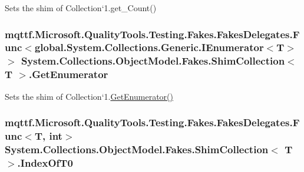 Sets the shim of Collection`1.get\-\_\-\-Count()

\hypertarget{class_system_1_1_collections_1_1_object_model_1_1_fakes_1_1_shim_collection_3_01_t_01_4_a61fd9b444d192f1d14a4c82d6c7f905e}{
\subsubsection[{Get\-Enumerator}]{\setlength{\rightskip}{0pt plus 5cm}mqttf.\-Microsoft.\-Quality\-Tools.\-Testing.\-Fakes.\-Fakes\-Delegates.\-Func$<$global.\-System.\-Collections.\-Generic.\-I\-Enumerator$<$T$>$ $>$ System.\-Collections.\-Object\-Model.\-Fakes.\-Shim\-Collection$<$ T $>$.Get\-Enumerator\hspace{0.3cm}{\ttfamily [set]}}}\label{class_system_1_1_collections_1_1_object_model_1_1_fakes_1_1_shim_collection_3_01_t_01_4_a61fd9b444d192f1d14a4c82d6c7f905e}


Sets the shim of Collection`1.\hyperlink{class_system_1_1_collections_1_1_object_model_1_1_fakes_1_1_shim_collection_3_01_t_01_4_a61fd9b444d192f1d14a4c82d6c7f905e}{Get\-Enumerator()}

\hypertarget{class_system_1_1_collections_1_1_object_model_1_1_fakes_1_1_shim_collection_3_01_t_01_4_a9410a51aa32fd25aa41816cc7a5461da}{
\subsubsection[{Index\-Of\-T0}]{\setlength{\rightskip}{0pt plus 5cm}mqttf.\-Microsoft.\-Quality\-Tools.\-Testing.\-Fakes.\-Fakes\-Delegates.\-Func$<$T, int$>$ System.\-Collections.\-Object\-Model.\-Fakes.\-Shim\-Collection$<$ T $>$.Index\-Of\-T0\hspace{0.3cm}{\ttfamily [set]}}}\label{class_system_1_1_collections_1_1_object_model_1_1_fakes_1_1_shim_collection_3_01_t_01_4_a9410a51aa32fd25aa41816cc7a5461da}


